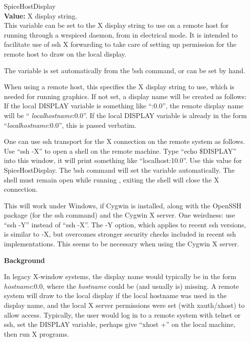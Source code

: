 \begin{description}
\item{\et SpiceHostDisplay}\\
{\bf Value:} X display string.\\
This variable can be set to the X display string to use on a remote
host for running {\WRspice} through a {\vt wrspiced} daemon, from
{\Xic} in electrical mode.  It is intended to facilitate use of {\vt
ssh} X forwarding to take care of setting up permission for the remote
host to draw on the local display.

The variable is set automatically from the {\cb !ssh} command, or can
be set by hand.

When using a remote host, this specifies the X display string to use,
which is needed for running graphics.  If not set, a display name will
be created as follows:  If the local {\et DISPLAY} variable is
something like ``{\vt :0.0}'', the remote display name will be ``{\it
localhostname\/}{\vt :0.0}''.  If the local {\et DISPLAY} variable is
already in the form ``{\it localhostname\/}{\vt :0.0}'', this is
passed verbatim.

One can use {\vt ssh} transport for the X connection on the remote
system as follows.  Use ``{\vt ssh -X}'' to open a shell on the remote
machine.  Type ``{\vt echo \$DISPLAY}'' into this window, it will
print something like ``{\vt localhost:10.0}''.  Use this value for
{\et SpiceHostDisplay}.  The {\cb !ssh} command will set the variable
automatically.  The shell must remain open while running {\WRspice},
exiting the shell will close the X connection.

This will work under Windows, if Cygwin is installed, along with the
OpenSSH package (for the {\vt ssh} command) and the Cygwin X server. 
One weirdness:  use ``{\vt ssh -Y}'' instead of ``{\vt ssh -X}''.  The
{\vt -Y} option, which applies to recent {\vt ssh} versions, is
similar to {\vt -X}, but overcomes stronger security checks included
in recent {\vt ssh} implementations.  This seems to be necessary when
using the Cygwin X server.

{\bf Background}

In legacy X-window systems, the display name would typically be in the
form {\it hostname\/}{\vt :0.0}, where the {\it hostname} could be
(and usually is) missing.  A remote system will draw to the local
display if the local hostname was used in the display name, and the
local X server permissions were set (with {\vt xauth}/{\vt xhost}) to
allow access.  Typically, the user would log in to a remote system
with {\vt telnet} or {\vt ssh}, set the {\et DISPLAY} variable,
perhaps give ``{\vt xhost +}'' on the local machine, then run X
programs.


\end{description}
